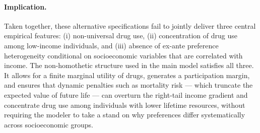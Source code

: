 \paragraph{Implication.}
Taken together, these alternative specifications fail to jointly deliver three central empirical features: (i) non-universal drug use, (ii) concentration of drug use among low-income individuals, and (iii) absence of ex-ante preference heterogeneity conditional on socioeconomic variables that are correlated with income. The non-homothetic structure used in the main model satisfies all three. It allows for a finite marginal utility of drugs, generates a participation margin, and ensures that dynamic penalties such as mortality risk — which truncate the expected value of future life — can overturn the right-tail income gradient and concentrate drug use among individuals with lower lifetime resources, without requiring the modeler to take a stand on why preferences differ systematically across socioeconomic groups.

%
%

\vspace{1cm}